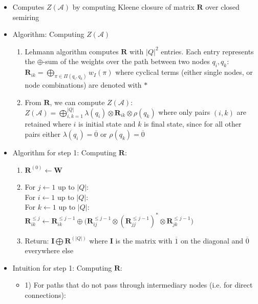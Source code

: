 \begin{itemize}
    \item Computes $Z(\mathcal{A})$ by computing Kleene closure of matrix $\boldsymbol{R}$ over closed semiring
    \item Algorithm: Computing $Z(\mathcal{A})$
    \begin{enumerate}
        \item Lehmann algorithm computes $\boldsymbol{R}$ with $|Q|^2$ entries. Each entry represents the $\oplus$-sum of the weights over the path between two nodes $q_i, q_k$:
        $
        \boldsymbol{R}_{ik} = \bigoplus_{\pi \in \Pi(q_i, q_k)} w_I(\pi)
        $
        where cyclical terms (either single nodes, or node combinations) are denoted with $*$
        \item From $\boldsymbol{R}$, we can compute $Z(\mathcal{A})$:
        $
        Z(\mathcal{A}) = \bigoplus_{i,k=1}^{|Q|} \lambda(q_i) \otimes \boldsymbol{R}_{ik} \otimes \rho(q_k)
        $ where only pairs $(i,k)$ are retained where $i$ is initial state and $k$ is final state, since for all other pairs either $\lambda(q_i) = \overline{0}$ or $\rho(q_k) = \overline{0}$
    \end{enumerate}
    \item Algorithm for step 1: Computing $\boldsymbol{R}$:
    \begin{enumerate}
        \item $\boldsymbol{R}^{(0)} \gets \boldsymbol{W}$
        \item For $j \gets 1$ up to $|Q|$:\\
        For $i \gets 1$ up to $|Q|$:\\
        For $k \gets 1$ up to $|Q|$:\\
        $
        \boldsymbol{R}_{ik}^{\leq j} \gets \boldsymbol{R}_{ik}^{\leq j-1} \oplus \big(\boldsymbol{R}_{ij}^{\leq j-1} \otimes (\boldsymbol{R}_{jj}^{\leq j-1})^* \otimes \boldsymbol{R}_{jk}^{\leq j-1}\big)
        $
        \item Return:
        $
        \boldsymbol{I} \bigoplus \boldsymbol{R}^{(|Q|)}
        $ where $\boldsymbol{I}$ is the matrix with $\overline{1}$ on the diagonal and $\overline{0}$ everywhere else
    \end{enumerate}
    \item Intuition for step 1: Computing $\boldsymbol{R}$:
    \begin{itemize}
        \item 1) For paths that do not pass through intermediary nodes (i.e. for direct connections):

\end{itemize}
\end{itemize}
